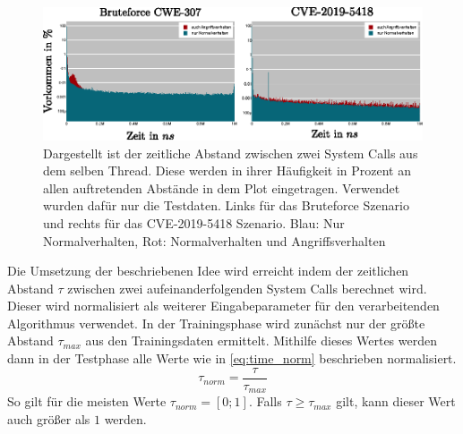                     \begin{figure}
                        \centering
                        \includegraphics[width=\textwidth]{images/CVE-2012--Test-data-time_delta.eps}
                        \caption{Dargestellt ist der zeitliche Abstand zwischen zwei System Calls aus dem selben Thread.
                                 Diese werden in ihrer Häufigkeit in Prozent an allen auftretenden Abstände in dem Plot eingetragen.
                                 Verwendet wurden dafür nur die Testdaten. Links für das Bruteforce Szenario und rechts für das CVE-2019-5418 Szenario.
                                 Blau: Nur Normalverhalten, Rot: Normalverhalten und Angriffsverhalten}
                        \label{fig:time_delta}
                    \end{figure}

                    Die Umsetzung der beschriebenen Idee wird erreicht indem der zeitlichen Abstand $\tau$ zwischen zwei aufeinanderfolgenden System Calls berechnet wird.
                    Dieser wird normalisiert als weiterer Eingabeparameter für den verarbeitenden Algorithmus verwendet.
                    In der Trainingsphase wird zunächst nur der größte Abstand $\tau_{max}$ aus den Trainingsdaten ermittelt.
                    Mithilfe dieses Wertes werden dann in der Testphase alle Werte wie in \autoref{eq:time_norm} beschrieben normalisiert.
                    \begin{equation}\label{eq:time_norm}
                        \tau_{norm} = \frac{\tau}{\tau_{max}}
                    \end{equation}
                    So gilt für die meisten Werte $\tau_{norm}=[0;1]$.
                    Falls $\tau\geq\tau_{max}$ gilt, kann dieser Wert auch größer als $1$ werden.

